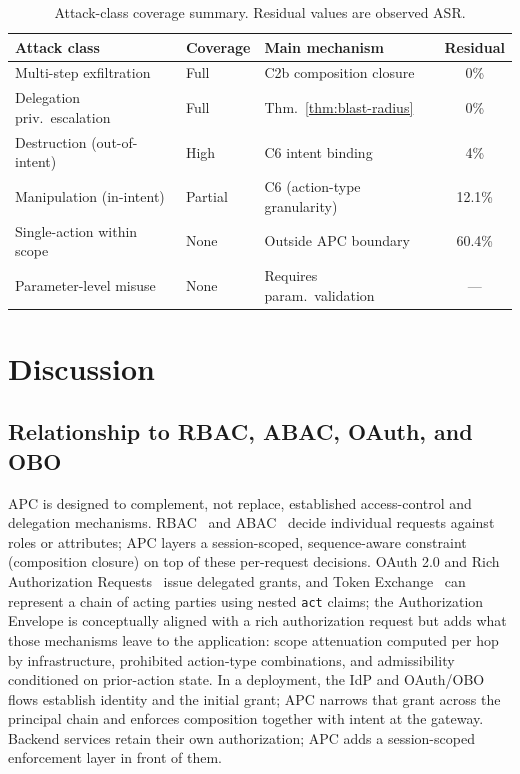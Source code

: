 \documentclass[sigconf,nonacm]{acmart}
\begin{document}
\begin{table}[t]
\centering
\footnotesize
\caption{Attack-class coverage summary. Residual values are observed ASR.}
\label{tab:attack-coverage}
\begin{tabularx}{\linewidth}{@{}ll>{\raggedright\arraybackslash}Xc@{}}
\toprule
\textbf{Attack class} & \textbf{Coverage} & \textbf{Main mechanism} & \textbf{Residual} \\
\midrule
Multi-step exfiltration & Full & C2b composition closure & 0\% \\
Delegation priv.\ escalation & Full & Thm.~\ref{thm:blast-radius} & 0\% \\
Destruction (out-of-intent) & High & C6 intent binding & 4\% \\
Manipulation (in-intent) & Partial & C6 (action-type granularity) & 12.1\% \\
Single-action within scope & None & Outside APC boundary & 60.4\% \\
Parameter-level misuse & None & Requires param.\ validation & --- \\
\bottomrule
\end{tabularx}
\end{table}

\section{Discussion}\label{sec:discussion}

\subsection{Relationship to RBAC, ABAC, OAuth, and OBO}\label{sec:relationship}

APC is designed to complement, not replace, established access-control and delegation mechanisms. RBAC~\cite{sandhu1996} and ABAC~\cite{hu2014} decide individual requests against roles or attributes; APC layers a session-scoped, sequence-aware constraint (composition closure) on top of these per-request decisions. OAuth 2.0 and Rich Authorization Requests~\cite{rfc9396} issue delegated grants, and Token Exchange~\cite{rfc8693} can represent a chain of acting parties using nested \texttt{act} claims; the Authorization Envelope is conceptually aligned with a rich authorization request but adds what those mechanisms leave to the application: scope attenuation computed per hop by infrastructure, prohibited action-type combinations, and admissibility conditioned on prior-action state. In a deployment, the IdP and OAuth/OBO flows establish identity and the initial grant; APC narrows that grant across the principal chain and enforces composition together with intent at the gateway. Backend services retain their own authorization; APC adds a session-scoped enforcement layer in front of them.
\end{document}
